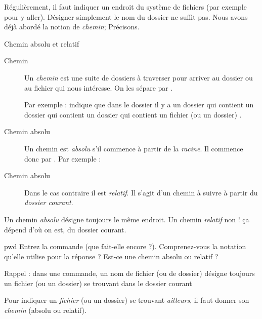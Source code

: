 \documentclass[a4paper,11pt]{style-esi/td}
\begin{document}
		\bigskip
		Régulièrement, il faut indiquer un endroit du système de fichiers 
		(par exemple pour y aller). 
		Désigner simplement le nom du dossier ne suffit pas.  
		Nous avons déjà abordé la notion de \emph{chemin}; Précisons.

		\begin{theorie}{Chemin absolu et relatif}
			\begin{description}
			\item[Chemin]
				Un \emph{chemin} est une suite de dossiers à traverser 
				pour arriver au dossier ou au fichier qui nous intéresse.
				On les sépare par \og{}\samp{/}\fg{}.

				Par exemple : 
				indique que dans le dossier 
				il y a un dossier 
				qui contient un dossier  
				qui contient un dossier  
				qui contient un fichier (ou un dossier) .
			\item[Chemin absolu]
				Un chemin est \emph{absolu} 
				s'il commence à partir de la \emph{racine}.
				Il commence donc par \og{}\samp{/}\fg{}.
				Par exemple : 
			\item[Chemin absolu]
				Dans le cas contraire il est \emph{relatif}.
				Il s'agit d'un chemin à suivre à partir du \emph{dossier courant}.
			\end{description}
		\end{theorie}

		\begin{alertbox}
			Un chemin \emph{absolu} désigne toujours le même endroit.
			Un chemin \emph{relatif} non ! \c ca dépend d'où on est,
			du dossier courant.
		\end{alertbox}

		\begin{Exercice}{pwd}
			Entrez la commande  (que fait-elle encore ?). 
			Comprenez-vous la notation qu'elle utilise pour la réponse ?
			Est-ce une chemin absolu ou relatif ?
		\end{Exercice}

		\begin{infobox}
			Rappel : dans une commande, un nom de fichier (ou de dossier)
			désigne toujours un fichier (ou un dossier) se trouvant
			dans le dossier courant
	
			Pour indiquer un \emph{fichier} (ou un dossier) 
			se trouvant \emph{ailleurs},
			il faut donner son \emph{chemin} (absolu ou relatif).
		\end{infobox}
\end{document}
